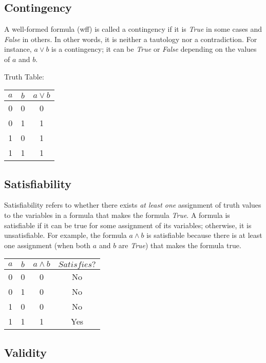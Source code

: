 \documentclass[12pt,a4paper,openany]{article}
\begin{document}
\subsection{Contingency}\label{contingency}

A well-formed formula (wff) is called a contingency if it is \emph{True}
in some cases and \emph{False} in others. In other words, it is neither
a tautology nor a contradiction. For instance, \(a \lor b\) is a
contingency; it can be \emph{True} or \emph{False} depending on the
values of \(a\) and \(b\).

Truth Table:

\begin{center}
\begin{tabular}{|c|c|c|}
\hline
\(a\) & \(b\) & \(a \lor b\) \\
\hline
0 & 0 & 0 \\
0 & 1 & 1 \\
1 & 0 & 1 \\
1 & 1 & 1 \\
\hline
\end{tabular}
\end{center}

\subsection{Satisfiability}\label{satisfiability}

Satisfiability refers to whether there exists \emph{at least one}
assignment of truth values to the variables in a formula that makes the
formula \emph{True}. A formula is satisfiable if it can be true for some
assignment of its variables; otherwise, it is unsatisfiable. For
example, the formula \(a \land b\) is satisfiable because there is at
least one assignment (when both \(a\) and \(b\) are \emph{True}) that
makes the formula true.

\begin{center}
\begin{tabular}{|c|c|c|c|}
\hline
\(a\) & \(b\) & \(a \land b\) & \(Satisfies?\) \\
\hline
0 & 0 & 0 & No \\
0 & 1 & 0 & No \\
1 & 0 & 0 & No \\
1 & 1 & 1 & Yes \\
\hline
\end{tabular}
\end{center}

\subsection{Validity}\label{validity}
\end{document}
